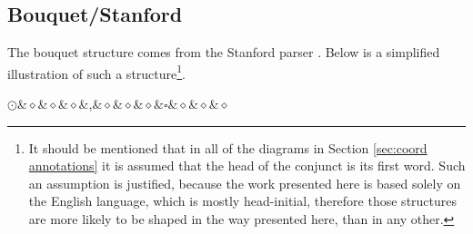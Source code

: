 \subsection{Bouquet/Stanford}
The bouquet structure comes from the Stanford parser \citep{de-marneffe-etal-2006-generating}. Below is a simplified illustration of such a structure\footnote{It should be mentioned that in all of the diagrams in Section \ref{sec:coord annotations} it is assumed that the head of the conjunct is its first word. Such an assumption is justified, because the work presented here is based solely on the English language, which is mostly head-initial, therefore those structures are more likely to be shaped in the way presented here, than in any other.}.

\begin{Center}
\begin{dependency}[theme = simple]
        \begin{deptext}
        
        $\odot$\&$\diamond$\&$\diamond$\&$\diamond$\&,\&$\diamond$\&$\diamond$\&$\diamond$\&$\square$\&$\diamond$\&$\diamond$\&$\diamond$\\
            \end{deptext}
        \end{dependency}
\end{Center}

